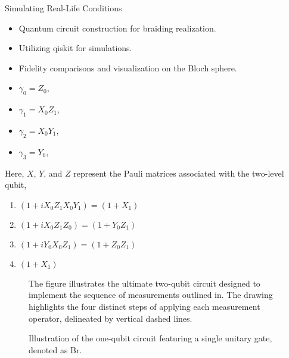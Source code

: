\documentclass{loyola-beamer}
\begin{document}
\begin{frame}{Simulating Real-Life Conditions}
	\begin{itemize}
		\item Quantum circuit construction for braiding realization.
		\item Utilizing qiskit for simulations.
		\item Fidelity comparisons and visualization on the Bloch sphere.
	\end{itemize}
\end{frame}

\begin{frame}
	\begin{itemize}
		\item $ \gamma_0 = Z_0 $,
		\item $ \gamma_1 = X_0 Z_1 $,
		\item $ \gamma_2 = X_0 Y_1 $,
		\item $ \gamma_3 = Y_0 $,
	\end{itemize}
	Here, \(X\), \(Y\), and \(Z\) represent the Pauli matrices associated with the two-level qubit,
	\begin{enumerate}
		\item $ (1 + i X_0 Z_1 X_0 Y_1) = (1 + X_1) $
		\item $ (1 + i X_0 Z_1 Z_0) = (1 + Y_0 Z_1) $
		\item $ (1 + i Y_0 X_0 Z_1) = (1 + Z_0 Z_1) $
		\item $ (1 + X_1) $
	\end{enumerate}
\end{frame}

\begin{frame}
	\begin{figure}
		\begin{center}
			
		\end{center}
		\caption{The figure illustrates the ultimate two-qubit circuit designed to implement the sequence of measurements outlined in. The drawing highlights the four distinct steps of applying each measurement operator, delineated by vertical dashed lines.}\label{fig:meas q circuit}
	\end{figure}
	\begin{figure}
		\begin{center}
			
		\end{center}
		\caption{Illustration of the one-qubit circuit featuring a single unitary gate, denoted as Br.}\label{fig:br circuit}
	\end{figure}
\end{frame}
\end{document}
